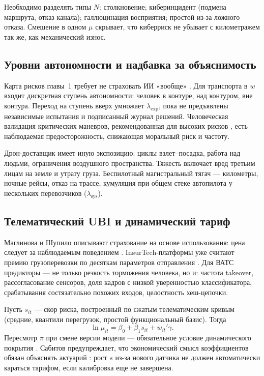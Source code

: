 \documentclass[a4paper,14pt]{extarticle}
\begin{document}
Необходимо разделять типы $N$: столкновение; киберинцидент (подмена маршрута, отказ канала); галлюцинация восприятия; простой из-за ложного отказа. Смешение в одном $\mu$ скрывает, что киберриск не убывает с километражем так же, как механический износ.

\subsection{Уровни автономности и надбавка за объяснимость}

Карта рисков главы~1 требует не страховать ИИ «вообще» \cite{zezina}. Для транспорта в $w$ входит дискретная ступень автономности: человек в контуре, над контуром, вне контура. Переход на ступень вверх умножает $\lambda_{\mathrm{exp}}$, пока не предъявлены независимые испытания и подписанный журнал решений. Человеческая валидация критических маневров, рекомендованная для высоких рисков \cite{cbr}, есть наблюдаемая предосторожность, снижающая моральный риск \cite{pindyck} и частоту.

Дрон-доставщик имеет иную экспозицию: циклы взлет--посадка, работа над людьми, ограничения воздушного пространства. Тяжесть включает вред третьим лицам на земле и утрату груза. Беспилотный магистральный тягач --- километры, ночные рейсы, отказ на трассе, кумуляция при общем стеке автопилота у нескольких перевозчиков ($\lambda_{\mathrm{sys}}$).

\subsection{Телематический UBI и динамический тариф}

Маглинова и Шупило описывают страхование на основе использования: цена следует за наблюдаемым поведением \cite{maglinova}. InsurTech-платформы уже считают премию грузоперевозки по десяткам параметров отправления \cite{insurtech}. Для ВАТС предикторы --- не только резкость торможения человека, но и: частота takeover, рассогласование сенсоров, доля кадров с низкой уверенностью классификатора, срабатывания состязательно похожих входов, целостность хеш-цепочки.

Пусть $s_{it}$ --- скор риска, построенный по сжатым телематическим кривым (средние, квантили перегрузок, простой функциональный базис). Тогда
\[
\ln\mu_{it}=\beta_0+\beta_1 s_{it}+w_{it}'\gamma.
\]
Пересмотр $\pi$ при смене версии модели --- обязательное условие динамического покрытия \cite{zezina}. Сабитов предупреждает, что экономический смысл коэффициентов обязан объяснять актуарий \cite{sabitov}: рост $s$ из-за нового датчика не должен автоматически караться тарифом, если калибровка еще не завершена.
\end{document}
